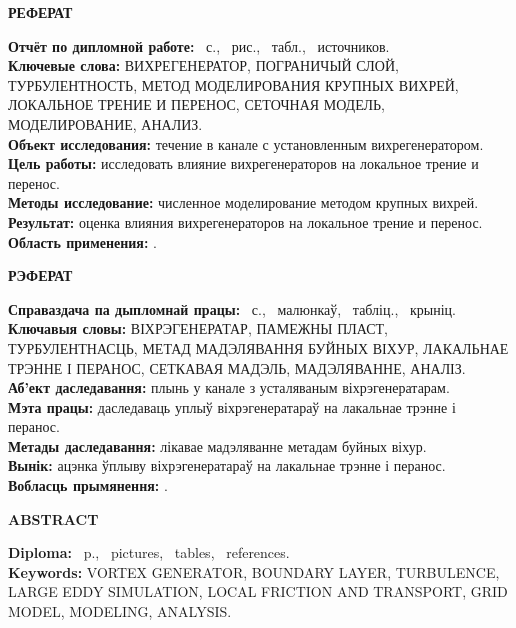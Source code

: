 \newpage
\tableofcontents
\newpage
\begin{center}
	\textbf{\MakeUppercase{реферат}}
\end{center}
\textbf{Отчёт по дипломной работе:} \pageref*{LastPage}~с., \totfig~рис., \tottab~табл., \totref~источников.\\
\textbf{Ключевые слова:} \MakeUppercase{вихрегенератор, пограничый слой, турбулентность, метод моделирования крупных вихрей, локальное трение и перенос, сеточная модель, моделирование, анализ}.\\
\textbf{Объект исследования:} течение в канале с установленным вихрегенератором.\\
\textbf{Цель работы:} исследовать влияние вихрегенераторов на локальное трение и перенос.\\
\textbf{Методы исследование:} численное моделирование методом крупных вихрей.\\
\textbf{Результат:} оценка влияния вихрегенераторов на локальное трение и перенос.\\
\textbf{Область применения:} .\\
\newpage
\begin{center}
	\textbf{\MakeUppercase{рэферат}}
\end{center}
\textbf{Справаздача па дыпломнай працы:} \pageref*{LastPage}~с., \totfig~малюнкаў, \tottab~табліц., \totref~крыніц.\\
\textbf{Ключавыя словы:} \MakeUppercase{віхрэгенератар, памежны пласт, турбулентнасць, метад мадэлявання буйных віхур, лакальнае трэнне і перанос, сеткавая мадэль, мадэляванне, аналіз}.\\
\textbf{Аб'ект даследавання:} плынь у канале з усталяваным віхрэгенератарам.\\
\textbf{Мэта працы:} даследаваць уплыў віхрэгенератараў на лакальнае трэнне і перанос.\\
\textbf{Метады даследавання:} лікавае мадэляванне метадам буйных віхур.\\
\textbf{Вынік:} ацэнка ўплыву віхрэгенератараў на лакальнае трэнне і перанос.\\
\textbf{Вобласць прымянення:} .\\
\newpage
\begin{center}
	\textbf{\MakeUppercase{abstract}}
\end{center}
\textbf{Diploma:} \pageref*{LastPage}~p., \totfig~pictures, \tottab~tables, \totref~references.\\
\textbf{Keywords:} \MakeUppercase{vortex generator, boundary layer, turbulence, large eddy simulation, local friction and transport, grid model, modeling, analysis}.\\

